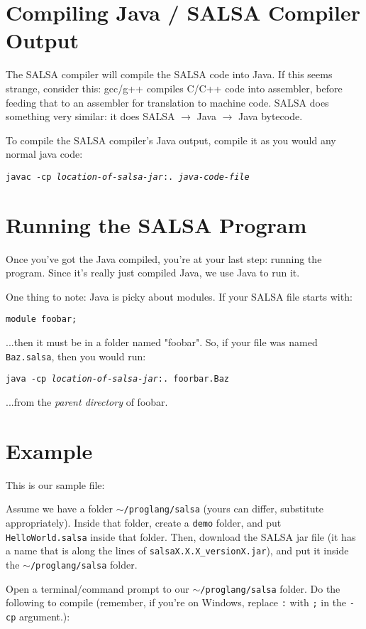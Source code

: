\documentclass{article}
\begin{document}
\section{Compiling Java / SALSA Compiler Output}
The SALSA compiler will compile the SALSA code into Java. If this seems
strange, consider this: gcc/g++ compiles C/C++ code into assembler, before
feeding that to an assembler for translation to machine code. SALSA does
something very similar: it does SALSA $ \to $ Java $ \to $ Java bytecode.

To compile the SALSA compiler's Java output, compile it as you would any
normal java code:

\texttt{javac -cp \textit{location-of-salsa-jar}:. \textit{java-code-file}}

\section{Running the SALSA Program}
Once you've got the Java compiled, you're at your last step: running the
program. Since it's really just compiled Java, we use Java to run it.

One thing to note: Java is picky about modules. If your SALSA file starts
with:

\texttt{module foobar;}

...then it must be in a folder named "foobar". So, if your file was named
\texttt{Baz.salsa}, then you would run:

\texttt{java -cp \textit{location-of-salsa-jar}:. foorbar.Baz}

...from the \textit{parent directory} of foobar.

\section{Example}
This is our sample file:


Assume we have a folder \texttt{$\sim$/proglang/salsa} (yours can differ,
substitute appropriately). Inside that folder, create a \texttt{demo} folder,
and put \texttt{HelloWorld.salsa} inside that folder. Then, download the SALSA
jar file (it has a name that is along the lines of
\texttt{salsaX.X.X\_versionX.jar}), and put it inside the
\texttt{$\sim$/proglang/salsa} folder.

Open a terminal/command prompt to our \texttt{$\sim$/proglang/salsa} folder.
Do the following to compile (remember, if you're on Windows, replace
\texttt{:} with \texttt{;} in the \texttt{-cp} argument.):
\end{document}
